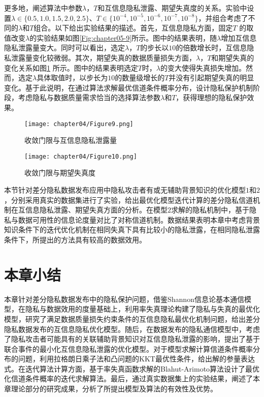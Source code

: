 更多地，阐述算法中参数$\lambda$，$T$和互信息隐私泄露、期望失真度的关系。实验中设置$\lambda \in \{0.5,1.0,1.5,2.0,2.5\}$、$T\in \{10^{-4},10^{-5},10^{-6},10^{-7},10^{-8}\}$，并组合考虑了不同的$\lambda$和$T$组合。以下给出实验结果的描述。首先，互信息隐私方面，固定$T$ 的取值改变$\lambda$的实验结果如图\ref{Fig:chapter05-9}所示。图中的结果表明，随$\lambda$增加互信息隐私泄露量变大。同时可以看出，选定$\lambda$，$T$的步长以$10$的倍数增长时，互信息隐私泄露量变化较微弱。其次，期望失真的数据质量损失方面，$\lambda$，$T$和期望失真的变化关系如图\ref{Fig:chapter05-10} 所示。图中的结果表明选定$T$时，$\lambda$的变大使得失真损失增加。然而，选定$\lambda$具体取值时，以步长为$10$的数量级增长的$T$并没有引起期望失真的明显变化。基于此说明，在通过算法求解最优信道条件概率分布，设计隐私保护机制阶段，考虑隐私与数据质量需求恰当的选择算法参数$\lambda$和$T$，获得理想的隐私保护效果。
\begin{figure}[htbp]
\centering
\begin{minipage}[t]{0.48\textwidth}
\centering
\texttt{[image: chapter04/Figure9.png]}
\caption{收敛门限与互信息隐私泄露量}
\label{Fig:chapter05-9}
\end{minipage}
\begin{minipage}[t]{0.48\textwidth}
\centering
\texttt{[image: chapter04/Figure10.png]}
\caption{收敛门限与期望失真度}
\label{Fig:chapter05-10}
\end{minipage}
\end{figure}



本节针对差分隐私数据发布应用中隐私攻击者有或无辅助背景知识的优化模型$1$和$2$，分别采用真实的数据集进行了实验，给出最优化模型迭代计算的差分隐私信道机制在互信息隐私泄露、期望失真方面的分析。在模型$2$求解的隐私机制中，基于隐私与数据可用性的信息论度量对比了对称信道机制。数据结果表明本章中考虑背景知识条件下的迭代优化机制在相同失真下具有比较小的隐私泄露，在相同隐私泄露条件下，所提出的方法具有较高的数据效用。

\section{本章小结}\label{chapter04-conclusion}
本章针对差分隐私数据发布中的隐私保护问题，借鉴Shannon信息论基本通信模型，在隐私与数据效用的度量基础上，利用率失真理论构建了隐私与失真的最优化模型，研究了满足数据质量损失约束条件的互信息隐私最优化机制问题，给出差分隐私数据发布的互信息隐私优化模型。随后，在数据发布的隐私通信模型中，考虑了隐私攻击者可能具有的关联辅助背景知识对互信息隐私泄露的影响，提出了基于联合事件的最小化互信息隐私泄露的优化模型。对于模型求解计算信道条件概率分布的问题，利用拉格朗日乘子法和凸问题的KKT最优性条件，给出解的参量表达式。在迭代算法计算方面，基于率失真函数求解的Blahut-Arimoto算法设计了最优化信道条件概率的迭代求解算法。最后，通过真实数据集上的实验结果，阐述了本章理论部分的研究成果，分析了所提出模型及算法的有效性及优势。

